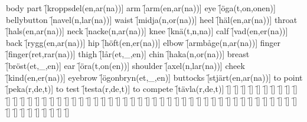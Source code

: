 \begin{questions}
    \begin{multicols}{2}
        \raggedcolumns
        \question body part \f[kroppsdel(en,ar(na))]
        \question arm \f[arm(en,ar(na))]
        \question eye \f[öga(t,on,onen)]
        \question bellybutton \f[navel(n,lar(na))]
        \question waist \f[midja(n,or(na))]
        \question heel \f[häl(en,ar(na))]
        \question throat \f[hals(en,ar(na))]
        \question neck \f[nacke(n,ar(na))]
        \question knee \f[knä(t,n,na)]
        \question calf \f[vad(en,er(na))]
        \question back \f[rygg(en,ar(na))]
        \question hip \f[höft(en,er(na))]
        \question elbow \f[armbåge(n,ar(na))]
        \question finger \f[finger(ret,rar(na))]
        \question thigh \f[lår(et,\_,en)]
        \question chin \f[haka(n,or(na))]
        \question breast \f[bröst(et,\_,en)]
        \question ear \f[öra(t,on(en))]
        \question shoulder \f[axel(n,lar(na))]
        \question cheek \f[kind(en,er(na))]
        \question eyebrow \f[ögonbryn(et,\_,en)]
        \question buttocks \f[stjärt(en,ar(na))]
        \question to point \f[peka(r,de,t)]
        \question to test \f[testa(r,de,t)]
        \question to compete \f[tävla(r,de,t)]
        \question \f[]
        \question \f[]
        \question \f[]
        \question \f[]
        \question \f[]
        \question \f[]
        \question \f[]
        \question \f[]
        \question \f[]
        \question \f[]
        \question \f[]
        \question \f[]
        \question \f[]
        \question \f[]
        \question \f[]
        \question \f[]
        \question \f[]
        \question \f[]
        \question \f[]
        \question \f[]
        \question \f[]
        \question \f[]
        \question \f[]
        \question \f[]
        \question \f[]
        \question \f[]
        \question \f[]
        \question \f[]
        \question \f[]
        \question \f[]
        \question \f[]
        \question \f[]
        \question \f[]
        \question \f[]
        \question \f[]
        \question \f[]
        \question \f[]
        \question \f[]
        \question \f[]
        \question \f[]
        \question \f[]
        \question \f[]
        \question \f[]
        \question \f[]
        \question \f[]
        \question \f[]
        \question \f[]
        \question \f[]
        \question \f[]
        \question \f[]
        \question \f[]
        \question \f[]
        \question \f[]
        \question \f[]
        \question \f[]
        \question \f[]
        \question \f[]
        \question \f[]
        \question \f[]

\end{multicols}
\end{questions}
